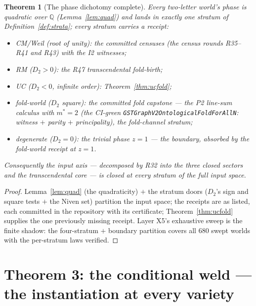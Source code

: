 \documentclass[11pt]{article}
\newcommand{\Q}{\mathbb Q}
\newtheorem{theorem}{Theorem}[section]
\begin{document}
\begin{theorem}[The phase dichotomy complete]\label{thm:dichotomy}
Every two-letter world's phase is quadratic over $\Q$
(Lemma~\ref{lem:quad}) and lands in exactly one stratum of
Definition~\ref{def:strata}; every stratum carries a receipt:
\begin{itemize}
\item CM/Weil (root of unity): the committed censuses (the census rounds R35--R41 and R43)
with the I2 witnesses;
\item RM ($D_2>0$): the R47 transcendental fold-birth;
\item UC ($D_2<0$, infinite order): Theorem~\ref{thm:ucfold};
\item fold-world ($D_2$ square): the committed fold capstone ---
the P2 line-sum calculus with $m^*=2$ (the CI-green
\texttt{GSTGraphV2OntologicalFoldForAllN}: witness $+$ parity
$+$ principality), the fold-channel stratum;
\item degenerate ($D_2=0$): the trivial phase $z=1$ --- the
boundary, absorbed by the fold-world receipt at $z=1$.
\end{itemize}
Consequently the input axis --- decomposed by R32 into the three
closed sectors and the transcendental core --- is closed at
\emph{every} stratum of the full input space.
\end{theorem}

\begin{proof}
Lemma~\ref{lem:quad} (the quadraticity) $+$ the stratum doors
($D_2$'s sign and square tests $+$ the Niven set) partition the input
space; the receipts are as listed, each committed in the repository
with its certificate; Theorem~\ref{thm:ucfold} supplies the one
previously missing receipt. Layer X5's exhaustive sweep is the finite
shadow: the four-stratum $+$ boundary partition covers all $680$
swept worlds with the per-stratum laws verified.
\end{proof}

\section{Theorem 3: the conditional weld --- the instantiation at every
variety}
\end{document}
